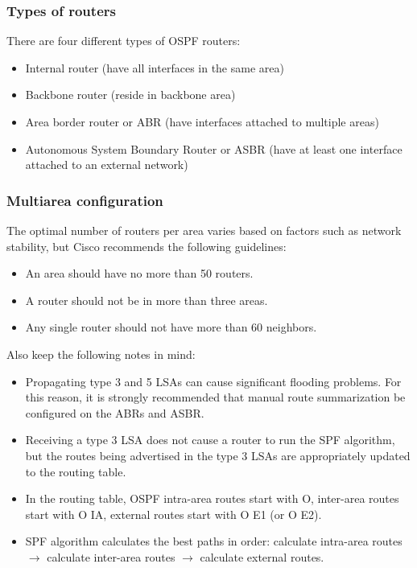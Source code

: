 \subsubsection{Types of routers}
There are four different types of OSPF routers:
\begin{itemize}
	\item Internal router (have all interfaces in the same area)
	\item Backbone router (reside in backbone area)
	\item Area border router or ABR (have interfaces attached to multiple areas)
	\item Autonomous System Boundary Router or ASBR (have at least one interface attached to an external network)
	\end{itemize}

\subsubsection{Multiarea configuration}
The optimal number of routers per area varies based on factors such as network stability, but Cisco recommends the following guidelines:
\begin{itemize}
	\item An area should have no more than 50 routers.
	\item A router should not be in more than three areas.
	\item Any single router should not have more than 60 neighbors.
	\end{itemize}

Also keep the following notes in mind:
\begin{itemize}
	\item Propagating type 3 and 5 LSAs can cause significant flooding problems. For this reason, it is strongly recommended that manual route summarization be configured on the ABRs and ASBR.
	\item Receiving a type 3 LSA does not cause a router to run the SPF algorithm, but the routes being advertised in the type 3 LSAs are appropriately updated to the routing table.
	\item In the routing table, OSPF intra-area routes start with O, inter-area routes start with O IA, external routes start with O E1 (or O E2).
	\item SPF algorithm calculates the best paths in order: calculate intra-area routes $\rightarrow$ calculate inter-area routes $\rightarrow$ calculate external routes.
	\end{itemize}

